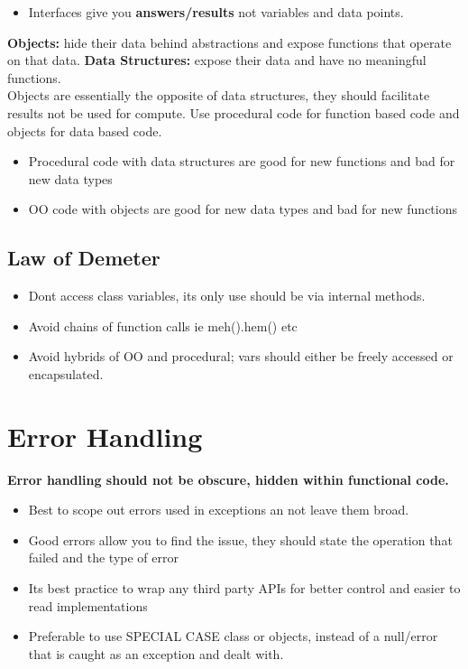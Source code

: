 \documentclass[11pt]{scrartcl} %
\begin{document}
\begin{itemize}
	\item Interfaces give you \textbf{answers/results} not variables and data points.
\end{itemize}

\textbf{Objects:} hide their data behind abstractions and expose functions that operate on that data.
\textbf{Data Structures:} expose their data and have no meaningful functions.\\

Objects are essentially the opposite of data structures, they should facilitate results not be used for compute.
Use procedural code for function based code and objects for data based code.

\begin{itemize}
	\item Procedural code with data structures are good for new functions and bad for new data types
	\item OO code with objects are good for new data types and bad for new functions
\end{itemize}

\subsection{Law of Demeter}

\begin{itemize}
	\item Dont access class variables, its only use should be via internal methods.
	\item Avoid chains of function calls ie meh().hem() etc
	\item Avoid hybrids of OO and procedural; vars should either be freely accessed or encapsulated.
\end{itemize}

\section{Error Handling}

\textbf{Error handling should not be obscure, hidden within functional code.}

\begin{itemize}
	\item Best to scope out errors used in exceptions an not leave them broad.
	\item Good errors allow you to find the issue, they should state the operation that failed and the type of error

	\item Its best practice to wrap any third party APIs for better control and easier to read implementations
	\item Preferable to use SPECIAL CASE class or objects, instead of a null/error that is caught as an exception and dealt with.
\end{itemize}
\end{document}
